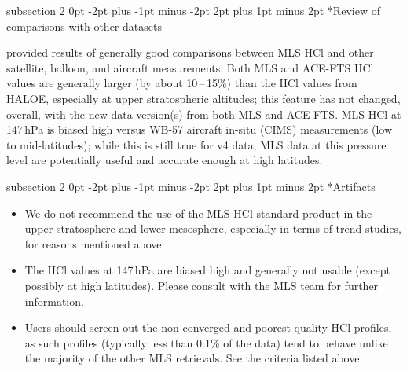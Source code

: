 \documentclass[11pt,draft]{report}
\makeatletter
\renewcommand{\subsection}{\@startsection%
  {subsection}%
  {2}%
  {0pt}%
  {-2pt plus -1pt minus -2pt}%
  {2pt plus 1pt minus 2pt}%
  {\large\sffamily\fontseries{sb}\selectfont\flushleft\color{SectionColor}\figureversion{tabular}}}%
\makeatother
\begin{document}
\subsection*{Review of comparisons with other datasets}

\citet{FroidevauxEtal08HCl} provided results of generally good
comparisons between MLS HCl and other satellite, balloon, and aircraft
measurements.  Both MLS and ACE-FTS HCl values are generally larger (by
about 10\,--\,15\%) than the HCl values from HALOE, especially at upper
stratospheric altitudes; this feature has not changed, overall, with the
new data version(s) from both MLS and ACE-FTS.  MLS HCl at 147\,hPa is
biased high versus WB-57 aircraft in-situ (CIMS) measurements (low to
mid-latitudes); while this is still true for v4 data, MLS data at this
pressure level are potentially useful and accurate enough at high
latitudes.

\subsection*{Artifacts}
\begin{itemize} 
\item We do not recommend the use of the MLS HCl standard product in 
  the upper stratosphere and lower mesosphere, especially in 
  terms of trend studies, for reasons mentioned above.
\item The HCl values at 147\,hPa are biased high and generally not
  usable (except possibly at high latitudes).  Please consult with the MLS
  team for further information.
\item Users should screen out the non-converged and poorest quality HCl
  profiles, as such profiles (typically less than 0.1\% of the data)
  tend to behave unlike the majority of the other MLS retrievals.  See
  the criteria listed above.
\end{itemize}  
\end{document}
